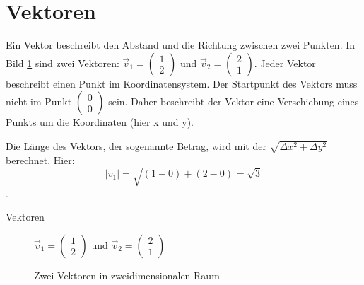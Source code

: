 \documentclass[a4paper, 10pt]{scrartcl}
\begin{document}
\section{Vektoren}

Ein Vektor beschreibt den Abstand und die Richtung zwischen zwei Punkten. In Bild \ref{fig:ZweiVektoren} sind zwei Vektoren: $\vec{v}_1= \left(\begin{array}{c} 1 \\ 2 \end{array}\right)$ und  $\vec{v}_2= \left(\begin{array}{c} 2 \\ 1 \end{array}\right)$. Jeder Vektor beschreibt einen Punkt im Koordinatensystem. Der Startpunkt des Vektors muss nicht im Punkt $\left(\begin{array}{c}0\\0\end{array}\right)$ sein. Daher beschreibt der Vektor eine Verschiebung eines Punkts um die Koordinaten (hier x und y).

Die Länge des Vektors, der sogenannte Betrag, wird mit der $\sqrt{\Delta x^2 + \Delta y^2}$ berechnet. Hier: \[|v_1| = \sqrt{(1 - 0) + (2 - 0)} = \sqrt{3}\].
\begin{frame}{Vektoren}
  \begin{figure}[htb]

    $\vec{v}_1= \left(\begin{array}{c} 1 \\ 2 \end{array}\right)$ und  $\vec{v}_2= \left(\begin{array}{c} 2 \\ 1 \end{array}\right)$
    \caption{Zwei Vektoren in zweidimensionalen Raum}
    \label{fig:ZweiVektoren}
  \end{figure}
\end{frame}
\end{document}
